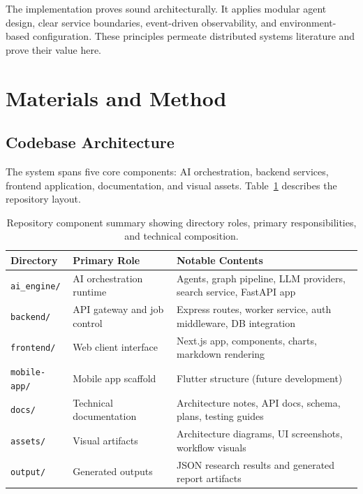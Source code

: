\documentclass[12pt, a4paper]{article}
\begin{document}
The implementation proves sound architecturally. It applies modular agent design, clear service boundaries, event-driven observability, and environment-based configuration. These principles permeate distributed systems literature and prove their value here.

\section{Materials and Method}

\subsection{Codebase Architecture}

The system spans five core components: AI orchestration, backend services, frontend application, documentation, and visual assets. Table~\ref{tab:repo_structure} describes the repository layout.

\begin{table}[H]
\centering
\caption{Repository component summary showing directory roles, primary responsibilities, and technical composition.}
\label{tab:repo_structure}
\begin{tabular}{p{2.4cm}|p{3.6cm}|p{5.0cm}}
\toprule
\textbf{Directory} & \textbf{Primary Role} & \textbf{Notable Contents} \\
\midrule
\texttt{ai\_engine/} & AI orchestration runtime & Agents, graph pipeline, LLM providers, search service, FastAPI app \\
\texttt{backend/} & API gateway and job control & Express routes, worker service, auth middleware, DB integration \\
\texttt{frontend/} & Web client interface & Next.js app, components, charts, markdown rendering \\
\texttt{mobile-app/} & Mobile app scaffold & Flutter structure (future development) \\
\texttt{docs/} & Technical documentation & Architecture notes, API docs, schema, plans, testing guides \\
\texttt{assets/} & Visual artifacts & Architecture diagrams, UI screenshots, workflow visuals \\
\texttt{output/} & Generated outputs & JSON research results and generated report artifacts \\
\bottomrule
\end{tabular}
\end{table}
\end{document}
